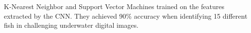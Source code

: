 \documentclass[conference]{IEEEtran}
\begin{document}
K-Nearest Neighbor and Support Vector Machines trained on the features
extracted by the CNN. They achieved 90\%
accuracy when identifying 15 different fish in challenging underwater
digital images.
\end{document}
